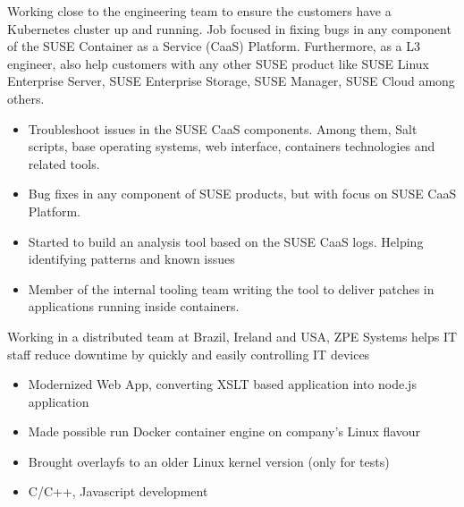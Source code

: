 \documentclass[10pt,a4paper]{altacv}
\begin{document}

\begin{fullwidth}
\makecvheader
\end{fullwidth}


Working close to the engineering team to ensure the customers have a Kubernetes cluster up and running. Job focused in fixing bugs in any component of the SUSE Container as a Service (CaaS) Platform. Furthermore, as a L3 engineer, also help customers with any other SUSE product like SUSE Linux Enterprise Server, SUSE Enterprise Storage, SUSE Manager, SUSE Cloud among others.
\begin{itemize}
\item Troubleshoot issues in the SUSE CaaS components. Among them, Salt scripts, base operating systems, web interface, containers technologies and related tools.
\item Bug fixes in any component of SUSE products, but with focus on SUSE CaaS Platform.
\item Started to build an analysis tool based on the SUSE CaaS logs. Helping identifying patterns and known issues
\item Member of the internal tooling team writing the tool to deliver patches in applications running inside containers. 
\end{itemize}

\divider

Working in a distributed team at Brazil, Ireland and USA, ZPE Systems helps IT staff reduce downtime by quickly and easily controlling IT devices
\begin{itemize}
\item Modernized Web App, converting XSLT based application into node.js application 
\item Made possible run Docker container engine on company's Linux flavour
\item Brought overlayfs to an older Linux kernel version (only for tests)
\item C/C++, Javascript development
\end{itemize}
\end{document}
